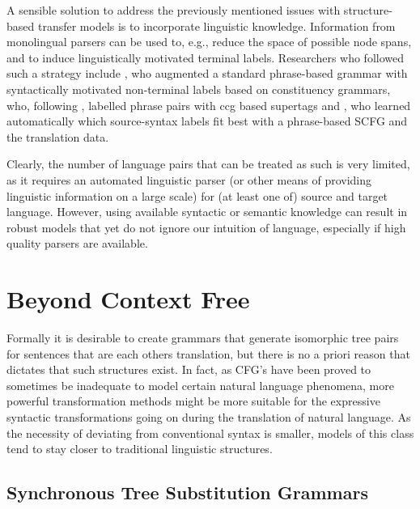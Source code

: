 A sensible solution to address the previously mentioned issues with structure-based transfer models is to incorporate linguistic knowledge. Information from monolingual parsers can be used to, e.g., reduce the space of possible node spans, and to induce linguistically motivated terminal labels. Researchers who followed such a strategy include \cite{zollmann2006syntax}, who augmented a standard phrase-based grammar with syntactically motivated non-terminal labels based on constituency grammars, \cite{almaghout2010ccg} who, following \cite{hassan2007supertagged}, labelled phrase pairs with ccg based supertags \citep{steedman2011combinatory} and \cite{mylonakis2011learning}, who learned automatically which source-syntax labels fit best with a phrase-based SCFG and the translation data.

Clearly, the number of language pairs that can be treated as such is very limited, as it requires an automated linguistic parser (or other means of providing linguistic information on a large scale) for (at least one of) source and target language. However, using available syntactic or semantic knowledge can result in robust models that yet do not ignore our intuition of language, especially if high quality parsers are available.

\section{Beyond Context Free}
\label{sec:bcf}

Formally it is desirable to create grammars that generate isomorphic tree pairs for sentences that are each others translation, but there is no a priori reason that dictates that such structures exist. In fact, as CFG's have been proved to sometimes be inadequate to model certain natural language phenomena, more powerful transformation methods might be more suitable for the expressive syntactic transformations going on during the translation of natural language. As the necessity of deviating from conventional syntax is smaller, models of this class tend to stay closer to traditional linguistic structures.

\subsection{Synchronous Tree Substitution Grammars}

